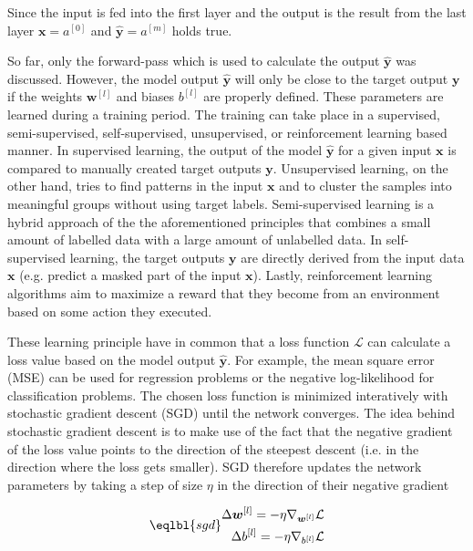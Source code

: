Since the input is fed into the first layer and the output is the result from the last layer \(\boldsymbol{x} = {a}^{[0]}\) and \(\boldsymbol{\hat{y}} = {a}^{[m]}\) holds true.

So far, only the forward-pass which is used to calculate the output \(\boldsymbol{\hat{y}}\) was discussed.
However, the model output \(\boldsymbol{\hat{y}}\) will only be close to the target output \(\boldsymbol{y}\) if the weights \(\boldsymbol{w}^{[l]}\) and biases \(b^{[l]}\) are properly defined.
These parameters are learned during a training period.
The training can take place in a supervised, semi-supervised, self-supervised, unsupervised, or reinforcement learning based manner.
In supervised learning, the output of the model \(\boldsymbol{\hat{y}}\) for a given input \(\boldsymbol{x}\) is compared to manually created target outputs \(\boldsymbol{y}\).
Unsupervised learning, on the other hand, tries to find patterns in the input \(\boldsymbol{x}\) and to cluster the samples into meaningful groups without using target labels.
Semi-supervised learning is a hybrid approach of the the aforementioned principles that combines a small amount of labelled data with a large amount of unlabelled data.
In self-supervised learning, the target outputs \(\boldsymbol{y}\) are directly derived from the input data \(\boldsymbol{x}\) (e.g. predict a masked part of the input \(\boldsymbol{x}\)).
Lastly, reinforcement learning algorithms aim to maximize a reward that they become from an environment based on some action they executed.

These learning principle have in common that a loss function \(\mathcal{L}\) can calculate a loss value based on the model output \(\boldsymbol{\hat{y}}\). 
For example, the mean square error (MSE) can be used for regression problems or the negative log-likelihood for classification problems.
The chosen loss function is minimized interatively with stochastic gradient descent (SGD) until the network converges.
The idea behind stochastic gradient descent is to make use of the fact that the negative gradient of the loss value points to the direction of the steepest descent (i.e. in the direction where the loss gets smaller).
SGD therefore updates the network parameters by taking a step of size \(\eta\) in the direction of their negative gradient

\begin{equation}\eqlbl{sgd}
	\begin{aligned}
		\Delta \boldsymbol{w}^{[l]} = -\eta \nabla_{\boldsymbol{w}^{[l]}} \mathcal{L}\\
		\Delta b^{[l]} = -\eta \nabla_{b^{[l]}} \mathcal{L}
	\end{aligned}
\end{equation}


